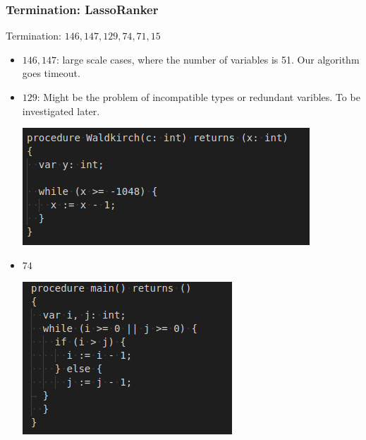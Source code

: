 \documentclass[10pt]{beamer}
\begin{document}
\begin{frame}\frametitle{Termination: LassoRanker}
Termination: $146,147,129,74,71,15$
\begin{itemize}
\item $146,147$: large scale cases, where the number of variables is 51. Our algorithm goes timeout.
\item $129$: Might be the problem of incompatible types or redundant varibles. To be investigated later.
\begin{center}
\includegraphics[scale=0.5]{129.png}
\end{center}
\item $74$
\begin{center}
\includegraphics[scale=0.40]{74.png}
\end{center}
\end{itemize}
\end{frame}
\end{document}
